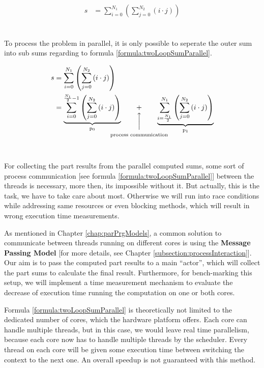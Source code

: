 \begin{align} \label{formula:twoLoopSum}
	\begin{aligned}
	s &= \sum_{i = 0}^{N_1} \left( \sum_{j = 0}^{N_2} \left(i \cdot j\right) \right)
	\end{aligned}
\end{align}
\

To process the problem in parallel, it is only possible to seperate the outer sum into sub sums regarding to formula \ref{formula:twoLoopSumParallel}.

\begin{align} \label{formula:twoLoopSumParallel}
	\begin{aligned}
	s &= \sum_{i = 0}^{N_1} \left( \sum_{j = 0}^{N_2} \left(i \cdot j\right) \right)
	\\ &=  \underbrace{ 
			\sum_{i = 0}^{\frac{N_1}{2} - 1} \left( \sum_{j = 0}^{N_2} \left(i \cdot j\right) \right)
 		}_\text{p\textsubscript{0}} \qquad \vertarrowbox{+}{process communication} \qquad \underbrace{  
 			\sum_{i = \frac{N_1}{2}}^{N_1} \left( \sum_{j = 0}^{N_2} \left(i \cdot j\right) \right)
		}_\text{p\textsubscript{1}}
	\end{aligned}
\end{align}
\

For collecting the part results from the parallel computed sums, some sort of process communication [see formula \ref{formula:twoLoopSumParallel}] between the threads is necessary, more then, its impossible without it. But actually, this is the task, we have to take care about most. Otherwise we will run into race conditions while addressing same resources or even blocking methods, which will result in wrong execution time measurements.

As mentioned in Chapter \ref{chap:parPrgModels}, a common solution to communicate between threads running on different cores is using the \textbf{Message Passing Model} [for more details, see Chapter \ref{subsection:processInteraction}]. Our aim is to pass the computed part results to a main ``actor'', which will collect the part sums to calculate the final result. Furthermore, for bench-marking this setup, we will implement a time measurement mechanism to evaluate the decrease of execution time running the computation on one or both cores. 

Formula \ref{formula:twoLoopSumParallel} is theoretically not limited to the dedicated number of cores, which the hardware platform offers. Each core can handle multiple threads, but in this case, we would leave real time parallelism, because each core now has to handle multiple threads by the scheduler. Every thread on each core will be given some execution time between switching the context to the next one. An overall speedup is not guaranteed with this method.   

